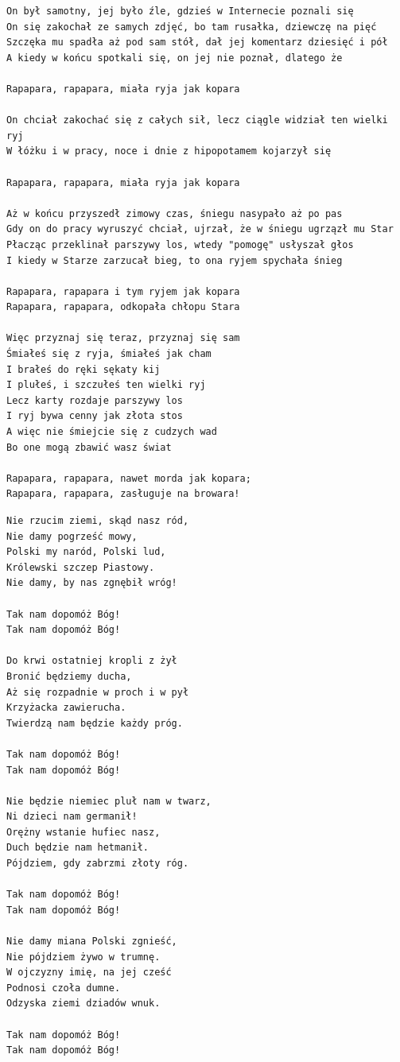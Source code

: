 \documentclass[12pt]{article}
\begin{document}
\begin{verbatim}
On był samotny, jej było źle, gdzieś w Internecie poznali się
On się zakochał ze samych zdjęć, bo tam rusałka, dziewczę na pięć
Szczęka mu spadła aż pod sam stół, dał jej komentarz dziesięć i pół
A kiedy w końcu spotkali się, on jej nie poznał, dlatego że

Rapapara, rapapara, miała ryja jak kopara

On chciał zakochać się z całych sił, lecz ciągle widział ten wielki ryj
W łóżku i w pracy, noce i dnie z hipopotamem kojarzył się

Rapapara, rapapara, miała ryja jak kopara

Aż w końcu przyszedł zimowy czas, śniegu nasypało aż po pas
Gdy on do pracy wyruszyć chciał, ujrzał, że w śniegu ugrzązł mu Star
Płacząc przeklinał parszywy los, wtedy "pomogę" usłyszał głos
I kiedy w Starze zarzucał bieg, to ona ryjem spychała śnieg

Rapapara, rapapara i tym ryjem jak kopara
Rapapara, rapapara, odkopała chłopu Stara

Więc przyznaj się teraz, przyznaj się sam
Śmiałeś się z ryja, śmiałeś jak cham
I brałeś do ręki sękaty kij
I plułeś, i szczułeś ten wielki ryj
Lecz karty rozdaje parszywy los
I ryj bywa cenny jak złota stos
A więc nie śmiejcie się z cudzych wad
Bo one mogą zbawić wasz świat

Rapapara, rapapara, nawet morda jak kopara;
Rapapara, rapapara, zasługuje na browara!
\end{verbatim}
\clearpage

\begin{verbatim}
Nie rzucim ziemi, skąd nasz ród,
Nie damy pogrześć mowy,
Polski my naród, Polski lud,
Królewski szczep Piastowy.
Nie damy, by nas zgnębił wróg!

Tak nam dopomóż Bóg!
Tak nam dopomóż Bóg!

Do krwi ostatniej kropli z żył
Bronić będziemy ducha,
Aż się rozpadnie w proch i w pył
Krzyżacka zawierucha.
Twierdzą nam będzie każdy próg.

Tak nam dopomóż Bóg!
Tak nam dopomóż Bóg!

Nie będzie niemiec pluł nam w twarz,
Ni dzieci nam germanił!
Orężny wstanie hufiec nasz,
Duch będzie nam hetmanił.
Pójdziem, gdy zabrzmi złoty róg.

Tak nam dopomóż Bóg!
Tak nam dopomóż Bóg!

Nie damy miana Polski zgnieść,
Nie pójdziem żywo w trumnę.
W ojczyzny imię, na jej cześć
Podnosi czoła dumne.
Odzyska ziemi dziadów wnuk.

Tak nam dopomóż Bóg!
Tak nam dopomóż Bóg!
\end{verbatim}
\clearpage
\end{document}
